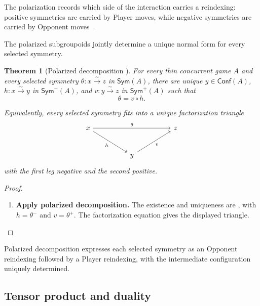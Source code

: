\documentclass[oneside]{article}
\newcommand{\Conf}{\mathsf{Conf}}
\newcommand{\Sym}{\mathsf{Sym}}
\theoremstyle{plain}
\newtheorem{theorem}{Theorem}[section]
\theoremstyle{definition}
\theoremstyle{remark}
\begin{document}
The polarization records which side of the interaction carries a reindexing: positive symmetries are carried by Player moves, while negative symmetries are carried by Opponent moves~\cite{CastellanClairambaultWinskel2019}.

The polarized subgroupoids jointly determine a unique normal form for every selected symmetry.

\begin{theorem}[Polarized decomposition
{\cite[Lemma~5.3]{ClairambaultOlimpieriPaquet2025}}]
\label{thm:cgqg-polarized-decomposition}
    For every thin concurrent game \(A\) and every selected symmetry \(\theta:x\xrightarrow{\sim}z\) in \(\Sym(A)\), there are unique \(y\in \Conf(A)\), \(h:x\xrightarrow{\sim}y\) in \(\Sym^-(A)\), and \(v:y\xrightarrow{\sim}z\) in \(\Sym^+(A)\) such that
    \begin{equation}
        \theta=v\circ h.
    \label{eq:cgqg-polarized-decomposition}
    \end{equation}

    Equivalently, every selected symmetry fits into a unique factorization triangle
    \begin{equation*}
        \begin{tikzcd}[column sep=huge,row sep=large]
            x \arrow[rr,"\theta"] \arrow[dr,"h"'] && z \\
            & y \arrow[ur,"v"'] &
        \end{tikzcd}
    \end{equation*}
    with the first leg negative and the second positive.
\end{theorem}
\begin{proof}
    \leavevmode
    \begin{enumerate}[beginpenalty=10000]
        \item \textbf{Apply polarized decomposition.} The existence and uniqueness are \cite[Lemma~5.3]{ClairambaultOlimpieriPaquet2025}, with \(h=\theta^-\) and \(v=\theta^+\). The factorization equation gives the displayed triangle. \qedhere
    \end{enumerate}
\end{proof}

Polarized decomposition expresses each selected symmetry as an Opponent reindexing followed by a Player reindexing, with the intermediate configuration uniquely determined. 

\subsection{Tensor product and duality}
\end{document}
